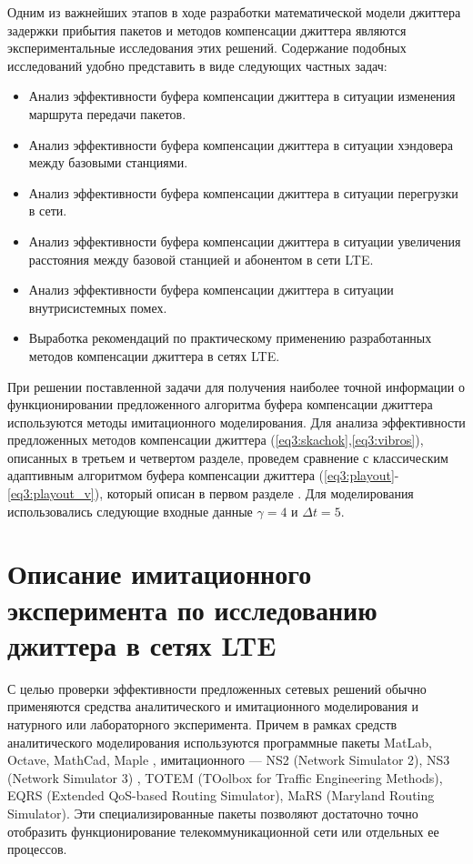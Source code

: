 Одним из важнейших этапов в ходе разработки математической модели джиттера задержки прибытия пакетов и методов компенсации джиттера являются экспериментальные исследования этих решений.
Содержание подобных исследований удобно представить в виде следующих частных задач:
\begin{itemize}
 \item Анализ эффективности буфера компенсации джиттера в ситуации изменения маршрута передачи пакетов.
 \item Анализ эффективности буфера компенсации джиттера в ситуации хэндовера между базовыми станциями.
 \item Анализ эффективности буфера компенсации джиттера в ситуации перегрузки в сети.
 \item Анализ эффективности буфера компенсации джиттера в ситуации увеличения расстояния между базовой станцией и абонентом в сети LTE.
 \item Анализ эффективности буфера компенсации джиттера в ситуации внутрисистемных помех.
 \item Выработка рекомендаций по практическому применению разработанных методов компенсации джиттера в сетях LTE.
\end{itemize}
При решении поставленной задачи для получения наиболее точной информации о функционировании предложенного алгоритма буфера компенсации джиттера используются методы имитационного моделирования.
Для анализа эффективности предложенных методов компенсации джиттера (\ref{eq3:skachok},\ref{eq3:vibros}), описанных в третьем и четвертом разделе, проведем сравнение с классическим адаптивным алгоритмом буфера компенсации джиттера (\ref{eq3:playout}-\ref{eq3:playout_v}), который описан в первом разделе \cite{Ramjee}. 
Для моделирования использовались следующие входные данные $\gamma=4$ и $\Delta t=5$.


\section{Описание имитационного эксперимента по исследованию джиттера в сетях LTE}

С целью проверки эффективности предложенных сетевых решений обычно применяются средства аналитического и имитационного моделирования и натурного или лабораторного эксперимента.
Причем в рамках средств аналитического моделирования используются программные пакеты MatLab, Octave, MathCad, Maple \cite{matlab,octave,mathcad,maple}, 
имитационного --- NS2 (Network Simulator 2), NS3 (Network Simulator 3) \cite{ns3}, TOTEM (TOolbox for Traffic Engineering Methods), 
EQRS (Extended QoS-based Routing Simulator), MaRS (Maryland Routing Simulator).
Эти специализированные пакеты позволяют достаточно точно отобразить функционирование телекоммуникационной сети или отдельных ее процессов.

